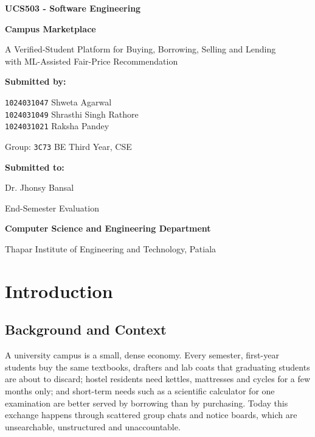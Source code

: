 \documentclass[12pt,letterpaper,twoside,openany]{report}
\newcommand{\course}{UCS503 - Software Engineering}
\begin{document}
\begin{titlepage}
\centering
{\bfseries \course\par}
\vspace{2.4cm}
{\LARGE\bfseries Campus Marketplace\par}
\vspace{0.3cm}
{\small A Verified-Student Platform for Buying, Borrowing, Selling and Lending\\
with ML-Assisted Fair-Price Recommendation\par}
\vspace{2.2cm}
{\bfseries Submitted by:\par}
\vspace{0.3cm}
{\small
\texttt{1024031047} Shweta Agarwal\\
\texttt{1024031049} Shrasthi Singh Rathore\\
\texttt{1024031021} Raksha Pandey\par}
\vspace{0.4cm}
{\small Group: \texttt{3C73} BE Third Year, CSE\par}
\vspace{2.2cm}
{\bfseries Submitted to:\par}
\vspace{0.3cm}
{\small Dr. Jhonsy Bansal\par}
\vfill
{\small End-Semester Evaluation\par}
\vspace{0.2cm}
{\bfseries Computer Science and Engineering Department\par}
\vspace{0.1cm}
{\small Thapar Institute of Engineering and Technology, Patiala\par}
\end{titlepage}

\clearpage
{}
\setcounter{page}{2}
\tableofcontents

\chapter{Introduction}

\section{Background and Context}
A university campus is a small, dense economy. Every semester, first-year students buy the same
textbooks, drafters and lab coats that graduating students are about to discard; hostel residents
need kettles, mattresses and cycles for a few months only; and short-term needs such as a
scientific calculator for one examination are better served by borrowing than by purchasing. Today
this exchange happens through scattered group chats and notice boards, which are unsearchable,
unstructured and unaccountable.
\end{document}
